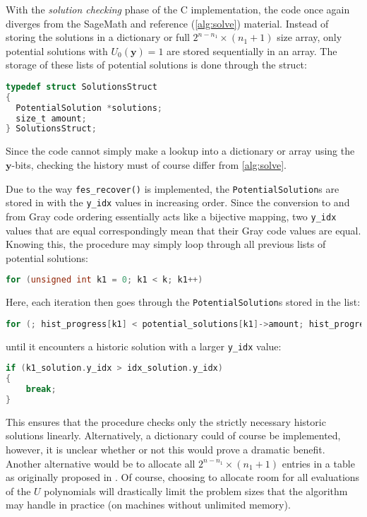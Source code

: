 With the \textit{solution checking} phase of the C implementation, the code once again diverges from the SageMath and reference (\cref{alg:solve}) material. Instead of storing the solutions in a dictionary or full $2^{n - n_1} \times (n_1 + 1)$ size array, only potential solutions with $U_0(\mathbf{y}) = 1$ are stored sequentially in an array. The storage of these lists of potential solutions is done through the struct:
\begin{lstlisting}[language=C,style=mystyle]
typedef struct SolutionsStruct
{
  PotentialSolution *solutions;
  size_t amount;
} SolutionsStruct;
\end{lstlisting}
Since the code cannot simply make a lookup into a dictionary or array using the $\mathbf{y}$-bits, checking the history must of course differ from \cref{alg:solve}. 

Due to the way \texttt{fes\_recover()} is implemented, the \texttt{PotentialSolution}s are stored in with the \texttt{y\_idx} values in increasing order. Since the conversion to and from Gray code ordering essentially acts like a bijective mapping, two \texttt{y\_idx} values that are equal correspondingly mean that their Gray code values are equal. Knowing this, the procedure may simply loop through all previous lists of potential solutions:
\begin{lstlisting}[language=C,style=mystyle]
for (unsigned int k1 = 0; k1 < k; k1++)
\end{lstlisting}
Here, each iteration then goes through the \texttt{PotentialSolution}s stored in the list:
\begin{lstlisting}[language=C,style=mystyle]
for (; hist_progress[k1] < potential_solutions[k1]->amount; hist_progress[k1]++)    
\end{lstlisting}
until it encounters a historic solution with a larger \texttt{y\_idx} value:
\begin{lstlisting}[language=C,style=mystyle]
if (k1_solution.y_idx > idx_solution.y_idx)
{
    break;
}
\end{lstlisting}
This ensures that the procedure checks only the strictly necessary historic solutions linearly. Alternatively, a dictionary could of course be implemented, however, it is unclear whether or not this would prove a dramatic benefit. Another alternative would be to allocate all $2^{n - n_1} \times (n_1 + 1)$ entries in a table as originally proposed in \cite{cryptoeprint:2021/578}. Of course, choosing to allocate room for all evaluations of the $U$ polynomials will drastically limit the problem sizes that the algorithm may handle in practice (on machines without unlimited memory).

